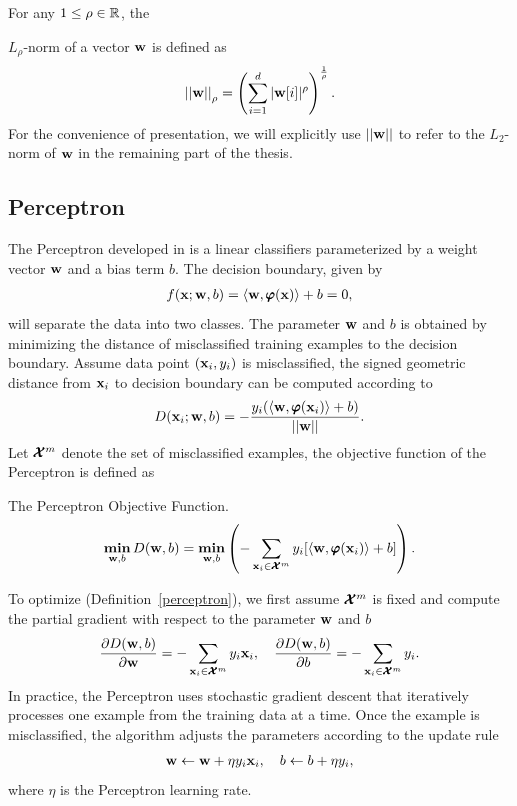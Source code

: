 For any $1\le\rho\in\mathbb{R}$, the {$L_{\rho}$-norm of a vector $\mathbf {w}$ is defined as
\begin{align*}
	\left|\left| \mathbf {w} \right|\right|_{\rho} = \left(\sum_{i=1}^{d}|\mathbf {w}[i]|^{\rho}\right)^{\frac{1}{\rho}}.
\end{align*}
For the convenience of presentation, we will explicitly use $||\mathbf {w}||$ to refer to the $L_2$-norm of $\mathbf {w}$ in the remaining part of the thesis.



%
%
\iffalse
\subsection{Perceptron}\label{sc_perceptron}

The Perceptron developed in \citep{Rosenblatt58,Rosenblatt62} is a linear classifiers parameterized by a weight vector $\mathbf {w}$ and a bias term $b$. 
The decision boundary, given by 
\begin{align*}
	f(\mathbf {x};\mathbf {w},b) = \langle \mathbf {w}, \pmb \varphi(\mathbf {x}) \rangle + b =0,
\end{align*}
will separate the data into two classes.
The parameter $\mathbf {w}$ and $b$ is obtained by minimizing the distance of misclassified training examples to the decision boundary.
Assume data point $(\mathbf {x}_i,y_i)$ is misclassified, the signed geometric distance from $\mathbf {x}_i$ to decision boundary can be computed according to
\begin{align*}
	D(\mathbf {x}_i;\mathbf {w},b) = -\frac{y_i(\langle \mathbf {w}, \pmb \varphi(\mathbf {x}_i) \rangle+b)}{\left|\left| \mathbf {w} \right|\right|}.
\end{align*}
Let $\pmb {\mathcal{X}}^m$ denote the set of misclassified examples, the objective function of the Perceptron is defined as
\begin{definition}{The Perceptron Objective Function.}\label{perceptron}
	\begin{align*}
		\underset{\mathbf {w},b}{\textbf{min}} \, D(\mathbf {w},b) = \underset{\mathbf {w},b}{\textbf{min}} \left( -\sum_{\mathbf {x}_i\in\pmb {\mathcal{X}}^{m}}y_i[\langle \mathbf {w}, \pmb \varphi(\mathbf {x}_i) \rangle+b]\right).
	\end{align*}
\end{definition}
\noindent
To optimize (Definition~\ref{perceptron}), we first assume $\pmb {\mathcal{X}}^{m}$ is fixed and compute the partial gradient with respect to the parameter $\mathbf {w}$ and $b$
\begin{align*}
	\frac{\partial D(\mathbf {w},b)}{\partial\mathbf {w}} = -\sum_{\mathbf {x}_i\in\pmb {\mathcal{X}}^m}{y_i\mathbf {x}_i},\quad
	\frac{\partial D(\mathbf {w},b)}{\partial b} = -\sum_{\mathbf {x}_i\in\pmb {\mathcal{X}}^m}{y_i}.
\end{align*}
In practice, the Perceptron uses stochastic gradient descent that iteratively processes one example from the training data at a time.
Once the example is misclassified, the algorithm adjusts the parameters according to the update rule
\begin{align*}
	\mathbf {w} \leftarrow \mathbf {w} + \eta y_i \mathbf {x}_i, \quad b \leftarrow b + \eta y_i,
\end{align*}
where $\eta$ is the Perceptron learning rate.

}
